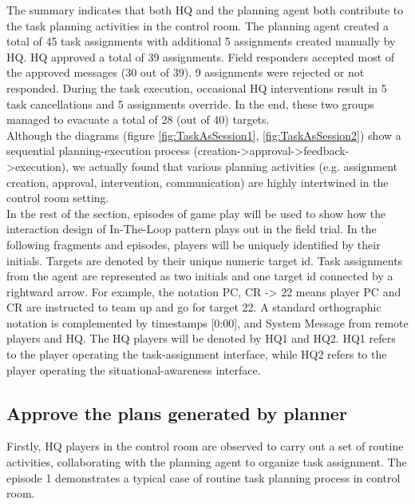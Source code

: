 The summary indicates that both HQ and the planning agent both contribute to the task planning activities in the control room. The planning agent created a total of 45 task assignments with additional 5 assignments created manually by HQ. HQ approved a total of 39 assignments. Field responders accepted most of the approved messages (30 out of 39). 9 assignments were rejected or not responded. During the task execution, occasional HQ interventions result in 5 task cancellations and 5 assignments override. In the end, these two groups managed to evacuate a total of 28 (out of 40) targets.\\ 

Although the diagrams (figure \ref{fig:TaskAsSession1}, \ref{fig:TaskAsSession2}) show a sequential planning-execution process (creation->approval->feedback->execution), we actually found that various planning activities (e.g. assignment creation, approval, intervention, communication) are highly intertwined in the control room setting. \\

In the rest of the section, episodes of game play will be used to show how the interaction design of In-The-Loop pattern plays out in the field trial.  In the following fragments and episodes, players will be uniquely identified by their initials. Targets are denoted by their unique numeric target id. Task assignments from the agent are represented as two initials and one target id connected by a rightward arrow. For example, the notation PC, CR -> 22 means player PC and CR are instructed to team up and go for target 22. A standard orthographic notation is complemented by timestamps [0:00], and System Message from remote players and HQ. The HQ players will be denoted by HQ1 and HQ2. HQ1 refers to the player operating the task-assignment interface, while HQ2 refers to the player operating the situational-awareness interface.\\

\subsection{Approve the plans generated by planner}
Firstly, HQ players in the control room are observed to carry out a set of routine activities, collaborating with the planning agent to organize task assignment. The episode 1 demonstrates a typical case of routine task planning process in control room. \\

